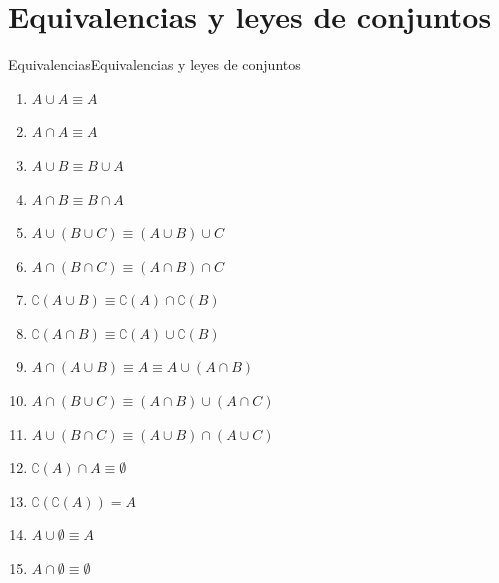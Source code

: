 \documentclass[spanish, c]{beamer}
\begin{document}
\section{Equivalencias y leyes de conjuntos}

\begin{frame}{Equivalencias}{Equivalencias y leyes de conjuntos}

    \begin{enumerate}
        \item $A \cup A \equiv A$
        \item $A \cap A \equiv A$
        \item $A \cup B \equiv B \cup A$
        \item $A \cap B \equiv B \cap A$
        \item $A \cup (B \cup C) \equiv (A \cup B) \cup C$
        \item $A \cap (B \cap C) \equiv (A \cap B) \cap C$
        \item $\complement(A \cup B) \equiv \complement(A) \cap \complement(B)$
        \item $\complement(A \cap B) \equiv \complement(A) \cup \complement(B)$
        \item $A \cap (A \cup B) \equiv A \equiv A \cup (A \cap B)$
        \item $A \cap (B \cup C) \equiv (A \cap B) \cup (A \cap C)$
        \item $A \cup (B \cap C) \equiv (A \cup B) \cap (A \cup C)$
        \item $\complement(A) \cap A \equiv \emptyset$
        \item $\complement(\complement(A)) = A$
        \item $A \cup \emptyset \equiv A$
        \item $A \cap \emptyset \equiv \emptyset$
    \end{enumerate}
\end{frame}

% 




\end{document}
